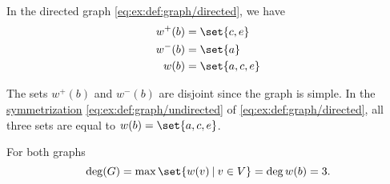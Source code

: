 \begin{example}\label{ex:def:graph_incidence}
  In the directed graph \eqref{eq:ex:def:graph/directed}, we have
  \begin{align*}
    w^+(b) &= \set{ c, e } \\
    w^-(b) &= \set{ a } \\
    w(b)   &= \set{ a, c, e }
  \end{align*}

  The sets \( w^+(b) \) and \( w^-(b) \) are disjoint since the graph is simple. In the \hyperref[def:graph/symmetrization]{symmetrization} \eqref{eq:ex:def:graph/undirected} of \eqref{eq:ex:def:graph/directed}, all three sets are equal to \( w(b) = \set{ a, c, e } \).

  For both graphs
  \begin{equation*}
    \deg(G) = \max\set{ w(v) \given v \in V } = \deg w(b) = 3.
  \end{equation*}
\end{example}

